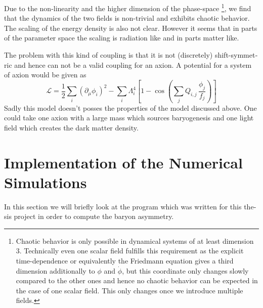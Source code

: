 \documentclass[master,       %
               twoside,        %
               BCOR10mm,       %
               english,ngerman, %
               ]{GAUBM}
\begin{document}
\begin{otherlanguage}{english}
Due to the non-linearity and the higher dimension of the phase-space \footnote{Chaotic behavior is only possible in dynamical systems of at least dimension $3$. Technically even one scalar field fulfills this requirement as the explicit time-dependence or equivalently the Friedmann equation gives a third dimension additionally to $\phi$ and $\dot{\phi}$, but this coordinate only changes slowly compared to the other ones and hence no chaotic behavior can be expected in the case of one scalar field. This only changes once we introduce multiple fields.}, we find that the dynamics of the two fields is non-trivial and exhibits chaotic behavior. The scaling of the energy density is also not clear. However it seems that in parts of the parameter space the scaling is radiation like and in parts matter like.

The problem with this kind of coupling is that it is not (discretely) shift-symmetric and hence can not be a valid coupling for an axion.
A potential for a system of axion would be given as
\begin{equation}
	\mathcal{L} = \frac{1}{2} \sum_i \left( \partial_\mu \phi_i \right)^2 - \sum_i \Lambda_i^4 \left[ 1 - \cos \left( \sum_j Q_{i,j} \, \frac{\phi_j}{f_j} \right) \right]
\end{equation}
Sadly this model doesn't posses the properties of the model discussed above. One could take one axion with a large mass which sources baryogenesis and one light field which creates the dark matter density.





\chapter{Implementation of the Numerical Simulations}
\label{sec:implementation_of_the_numerical_simulations}
In this section we will briefly look at the program which was written for this thesis project in order to compute the baryon asymmetry.


\end{otherlanguage}
\end{document}
